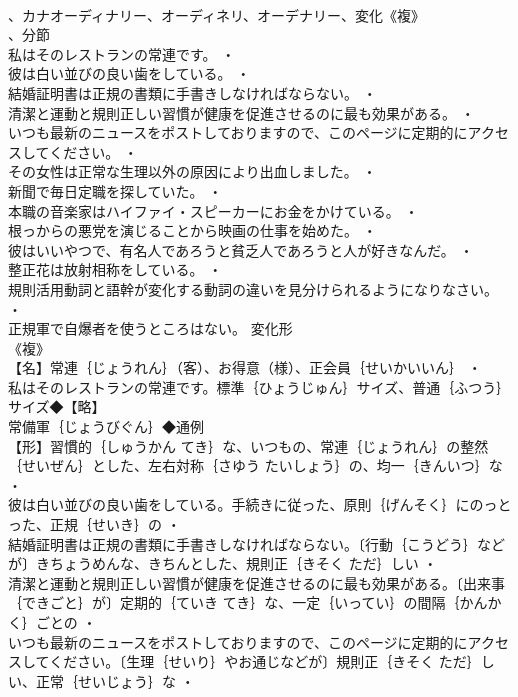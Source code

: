 \documentclass[8pt]{extreport}
\begin{document}
\begin{CJK}{UTF8}{min}
\\	、カナオーディナリー、オーディネリ、オーデナリー、変化《複》
\\	、分節
\\	私はそのレストランの常連です。 ・
\\	彼は白い並びの良い歯をしている。 ・
\\	結婚証明書は正規の書類に手書きしなければならない。 ・
\\	清潔と運動と規則正しい習慣が健康を促進させるのに最も効果がある。 ・
\\	いつも最新のニュースをポストしておりますので、このページに定期的にアクセスしてください。 ・
\\	その女性は正常な生理以外の原因により出血しました。 ・
\\	新聞で毎日定職を探していた。 ・
\\	本職の音楽家はハイファイ・スピーカーにお金をかけている。 ・
\\	根っからの悪党を演じることから映画の仕事を始めた。 ・
\\	彼はいいやつで、有名人であろうと貧乏人であろうと人が好きなんだ。 ・
\\	整正花は放射相称をしている。 ・
\\	規則活用動詞と語幹が変化する動詞の違いを見分けられるようになりなさい。 ・
\\	正規軍で自爆者を使うところはない。	変化形 
\\	《複》
\\	【名】常連｛じょうれん｝（客）、お得意（様）、正会員｛せいかいいん｝ ・
\\	私はそのレストランの常連です。標準｛ひょうじゅん｝サイズ、普通｛ふつう｝サイズ◆【略】
\\	常備軍｛じょうびぐん｝◆通例
\\	【形】習慣的｛しゅうかん てき｝な、いつもの、常連｛じょうれん｝の整然｛せいぜん｝とした、左右対称｛さゆう たいしょう｝の、均一｛きんいつ｝な ・
\\	彼は白い並びの良い歯をしている。手続きに従った、原則｛げんそく｝にのっとった、正規｛せいき｝の ・
\\	結婚証明書は正規の書類に手書きしなければならない。〔行動｛こうどう｝などが〕きちょうめんな、きちんとした、規則正｛きそく ただ｝しい ・
\\	清潔と運動と規則正しい習慣が健康を促進させるのに最も効果がある。〔出来事｛できごと｝が〕定期的｛ていき てき｝な、一定｛いってい｝の間隔｛かんかく｝ごとの ・
\\	いつも最新のニュースをポストしておりますので、このページに定期的にアクセスしてください。〔生理｛せいり｝やお通じなどが〕規則正｛きそく ただ｝しい、正常｛せいじょう｝な ・

\end{CJK}
\end{document}
